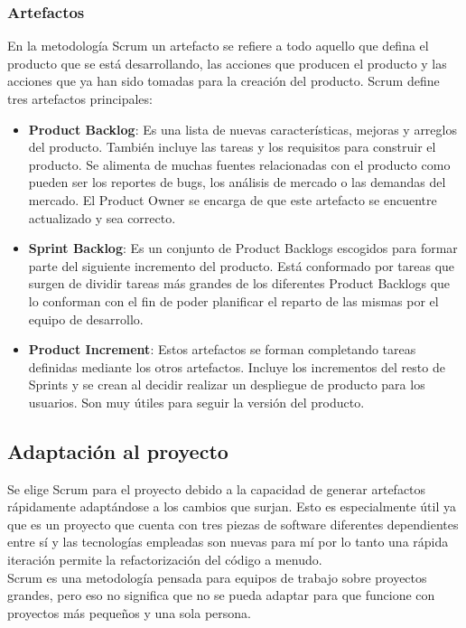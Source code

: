 \subsubsection{Artefactos}
En la metodología Scrum un artefacto se refiere a todo aquello que defina el producto que se está desarrollando, las acciones que producen el producto y las acciones que ya han sido tomadas para la creación del producto. Scrum define tres artefactos principales:
\begin{itemize}
	\item \textbf{Product Backlog}: Es una lista de nuevas características, mejoras y arreglos del producto. También incluye las tareas y los requisitos para construir el producto. Se alimenta de muchas fuentes relacionadas con el producto como pueden ser los reportes de bugs, los análisis de mercado o las demandas del mercado. El Product Owner se encarga de que este artefacto se encuentre actualizado y sea correcto.
	\item \textbf{Sprint Backlog}: Es un conjunto de Product Backlogs escogidos para formar parte del siguiente incremento del producto. Está conformado por tareas que surgen de dividir tareas más grandes de los diferentes Product Backlogs que lo conforman con el fin de poder planificar el reparto de las mismas por el equipo de desarrollo.
	\item \textbf{Product Increment}: Estos artefactos se forman completando tareas definidas mediante los otros artefactos. Incluye los incrementos del resto de Sprints y se crean al decidir realizar un despliegue de producto para los usuarios. Son muy útiles para seguir la versión del producto.
\end{itemize}

\subsection{Adaptación al proyecto}
Se elige Scrum para el proyecto debido a la capacidad de generar artefactos rápidamente adaptándose a los cambios que surjan. Esto es especialmente útil ya que es un proyecto que cuenta con tres piezas de software diferentes dependientes entre sí y las tecnologías empleadas son nuevas para mí por lo tanto una rápida iteración permite la refactorización del código a menudo.
\\

Scrum es una metodología pensada para equipos de trabajo sobre proyectos grandes, pero eso no significa que no se pueda adaptar para que funcione con proyectos más pequeños y una sola persona.
\\

